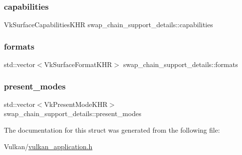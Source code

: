 \subsubsection{\texorpdfstring{capabilities}{capabilities}}
{\footnotesize\ttfamily Vk\+Surface\+Capabilities\+K\+HR swap\+\_\+chain\+\_\+support\+\_\+details\+::capabilities}

\mbox{\label{structswap__chain__support__details_a7009f574ac663c1a6fbc6a563798f81d}} 
\subsubsection{\texorpdfstring{formats}{formats}}
{\footnotesize\ttfamily std\+::vector$<$Vk\+Surface\+Format\+K\+HR$>$ swap\+\_\+chain\+\_\+support\+\_\+details\+::formats}

\mbox{\label{structswap__chain__support__details_ac76e296ce9fc91e091adb661608c9ad5}} 
\subsubsection{\texorpdfstring{present\+\_\+modes}{present\_modes}}
{\footnotesize\ttfamily std\+::vector$<$Vk\+Present\+Mode\+K\+HR$>$ swap\+\_\+chain\+\_\+support\+\_\+details\+::present\+\_\+modes}



The documentation for this struct was generated from the following file\+:\begin{DoxyCompactItemize}
\item 
Vulkan/\mbox{\hyperlink{vulkan__application_8h}{vulkan\+\_\+application.\+h}}\end{DoxyCompactItemize}
